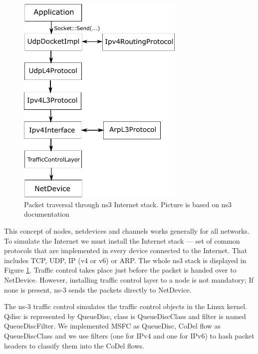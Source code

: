 
\begin{figure}
	\centering
	\includegraphics[width=80mm]{drawings/ns3_internet_stack}
	\captionsetup{justification=centering}
	\caption{Packet traversal through ns3 Internet stack. Picture is based on ns3 documentation \cite[p. 88]{ns3Doc}}
	\label{fig13:ns3}
\end{figure}

This concept of nodes, netdevices and channels works generally for all networks. To simulate the Internet we must install the Internet stack --- set of common protocols that are implemented in every device connected to the Internet. That includes TCP, UDP, IP (v4 or v6) or ARP. The whole ns3 stack is displayed in Figure \ref{fig13:ns3}. Traffic control takes place just before the packet is handed over to NetDevice. However, installing traffic control layer to a node is not mandatory; If none is present, ns-3 sends the packets directly to NetDevice.

The ns-3 traffic control simulates the traffic control objects in the Linux kernel. Qdisc is represented by QueueDisc, class is QueueDiscClass and filter is named QueueDiscFilter. We implemented MSFC as QueueDisc, CoDel flow as QueueDiscClass and we use filters (one for IPv4 and one for IPv6) to hash packet headers to classify them into the CoDel flows.

